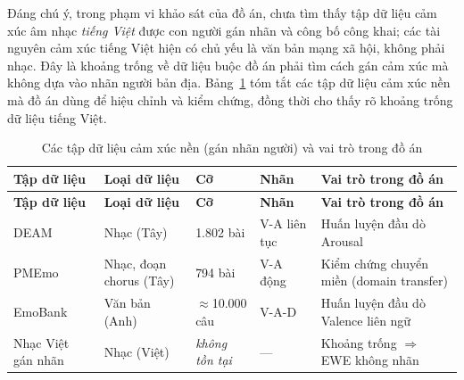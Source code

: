 \documentclass[../DoAn.tex]{subfiles}
\begin{document}
Đáng chú ý, trong phạm vi khảo sát của đồ án, chưa tìm thấy tập dữ liệu cảm xúc âm nhạc \textit{tiếng Việt} được con người gán nhãn và công bố công khai; các tài nguyên cảm xúc tiếng Việt hiện có chủ yếu là văn bản mạng xã hội, không phải nhạc. Đây là khoảng trống về dữ liệu buộc đồ án phải tìm cách gán cảm xúc mà không dựa vào nhãn người bản địa. Bảng~\ref{table:merdata} tóm tắt các tập dữ liệu cảm xúc nền mà đồ án dùng để hiệu chỉnh và kiểm chứng, đồng thời cho thấy rõ khoảng trống dữ liệu tiếng Việt.

\begin{longtable}{|p{2.6cm}|p{2.6cm}|p{2.0cm}|p{2.2cm}|p{3.0cm}|}
\caption{Các tập dữ liệu cảm xúc nền (gán nhãn người) và vai trò trong đồ án}\label{table:merdata}\\
\hline
\textbf{Tập dữ liệu} & \textbf{Loại dữ liệu} & \textbf{Cỡ} & \textbf{Nhãn} & \textbf{Vai trò trong đồ án} \\
\hline
\endfirsthead
\hline
\textbf{Tập dữ liệu} & \textbf{Loại dữ liệu} & \textbf{Cỡ} & \textbf{Nhãn} & \textbf{Vai trò trong đồ án} \\
\hline
\endhead
DEAM \cite{aljanaki2017deam} & Nhạc (Tây) & 1.802 bài & V-A liên tục & Huấn luyện đầu dò Arousal \\
\hline
PMEmo \cite{zhang2018pmemo} & Nhạc, đoạn chorus (Tây) & 794 bài & V-A động & Kiểm chứng chuyển miền (domain transfer) \\
\hline
EmoBank \cite{buechel2017emobank} & Văn bản (Anh) & $\approx$10.000 câu & V-A-D & Huấn luyện đầu dò Valence liên ngữ \\
\hline
Nhạc Việt gán nhãn & Nhạc (Việt) & \textit{không tồn tại} & --- & Khoảng trống $\Rightarrow$ EWE không nhãn \\
\hline
\end{longtable}
\end{document}
